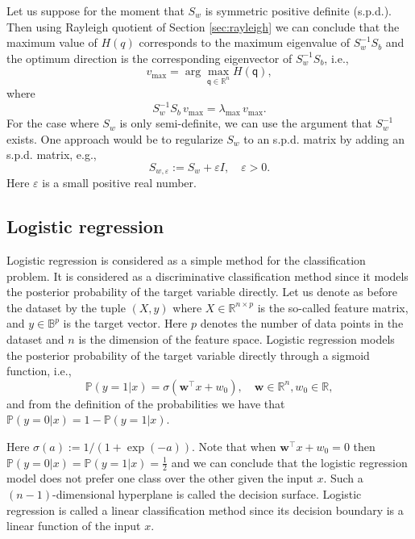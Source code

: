 \documentclass[11pt]{article}
\newcommand{\w}{\textbf{w}}
\newcommand{\R}{\mathbb{R}}
\newcommand{\B}{\mathbb{B}}
\newcommand{\Pro}{\mathbb{P}}
\newcommand{\q}{\textsf{q}}
\begin{document}
Let us suppose for the moment that $S_w$ is symmetric positive
definite (s.p.d.). Then using Rayleigh quotient of Section
\ref{sec:rayleigh} we can conclude that the maximum value of $H(q)$
corresponds to the maximum eigenvalue of $S_w^{-1} S_b$ and the
optimum direction is the corresponding eigenvector of $S_w^{-1} S_b$,
i.e.,
\begin{equation}
	v_{\max} = \arg \max_{\q\in \R^{n}} H(\q),
\end{equation}
where
\begin{equation}
	S_w^{-1} S_b \, v_{\max} = \lambda_{\max} \, v_{\max}.
\end{equation}
For the case where $S_w$ is only semi-definite, we can use the
argument that $S_w^{-1}$ exists. One approach would be to regularize
$S_w$ to an s.p.d. matrix by adding an s.p.d. matrix, e.g.,
\begin{equation}
	S_{w,\varepsilon} := S_w + \varepsilon I, \quad \varepsilon >
        0.
\end{equation}
Here $\varepsilon$ is a small positive real number.
\subsection{Logistic regression}
Logistic regression is considered as a simple method for the classification problem. It is considered as a discriminative classification method since it models the posterior probability of the target variable directly. Let us denote as before the dataset by the tuple $(X, y)$ where $X \in \R^{n
  \times p}$ is the so-called feature matrix, and $y \in \B^{p}$ is the target vector. Here $p$ denotes the number of data points in the dataset and $n$ is the dimension of the feature space. Logistic regression models the posterior probability of the target variable directly through a sigmoid function, i.e.,
\begin{equation}
	\Pro(y=1|x) = \sigma( \w^\top x + w_0), \quad \w \in \R^{n}, w_0 \in \R,
\end{equation}
and from the definition of the probabilities we have that $\Pro(y=0|x) = 1 - \Pro(y=1|x)$.

Here $\sigma(a) := 1/(1+\exp(-a))$. Note that when $\w^\top x + w_0 = 0$ then $\Pro(y=0|x) = \Pro(y=1|x) = \frac12$ and we can conclude that the logistic regression model does not prefer one class over the other given the input $x$. Such a $(n-1)$-dimensional hyperplane is called the decision surface. Logistic regression is called a linear classification method since its decision boundary is a linear function of the input $x$.
\end{document}
